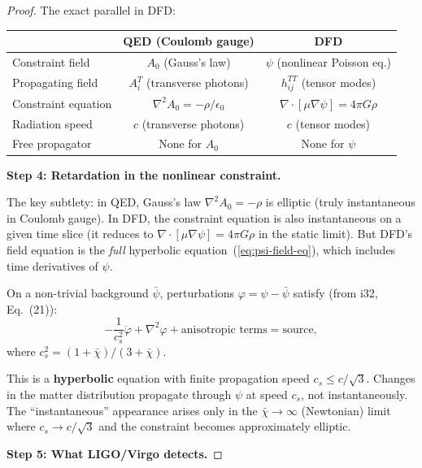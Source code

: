 \documentclass[11pt,a4paper]{article}
\begin{document}
\begin{proof}
The exact parallel in DFD:
\begin{center}
\begin{tabular}{lcc}
\toprule
& \textbf{QED (Coulomb gauge)} & \textbf{DFD} \\
\midrule
Constraint field & $A_0$ (Gauss's law) & $\psi$ (nonlinear Poisson eq.) \\
Propagating field & $A_i^T$ (transverse photons) & $h_{ij}^{TT}$ (tensor modes) \\
Constraint equation & $\nabla^2 A_0 = -\rho/\epsilon_0$ & $\nabla\cdot[\mu\nabla\psi] = 4\pi G\rho$ \\
Radiation speed & $c$ (transverse photons) & $c$ (tensor modes) \\
Free propagator & None for $A_0$ & None for $\psi$ \\
\bottomrule
\end{tabular}
\end{center}

\textbf{Step 4: Retardation in the nonlinear constraint.}

The key subtlety: in QED, Gauss's law $\nabla^2 A_0 = -\rho$ is elliptic (truly instantaneous in Coulomb gauge). In DFD, the constraint equation is also instantaneous on a given time slice (it reduces to $\nabla\cdot[\mu\nabla\psi] = 4\pi G\rho$ in the static limit). But DFD's field equation is the \emph{full} hyperbolic equation~(\ref{eq:psi-field-eq}), which includes time derivatives of $\psi$.

On a non-trivial background $\bar\psi$, perturbations $\varphi = \psi - \bar\psi$ satisfy (from i32, Eq.~(21)):
\begin{equation}\label{eq:pert-eq}
-\frac{1}{c_s^2}\ddot\varphi + \nabla^2\varphi + \text{anisotropic terms} = \text{source},
\end{equation}
where $c_s^2 = (1+\bar\chi)/(3+\bar\chi)$.

This is a \textbf{hyperbolic} equation with finite propagation speed $c_s \leq c/\sqrt{3}$. Changes in the matter distribution propagate through $\psi$ at speed $c_s$, not instantaneously. The ``instantaneous'' appearance arises only in the $\bar\chi \to \infty$ (Newtonian) limit where $c_s \to c/\sqrt{3}$ and the constraint becomes approximately elliptic.

\textbf{Step 5: What LIGO/Virgo detects.}


\end{proof}
\end{document}
